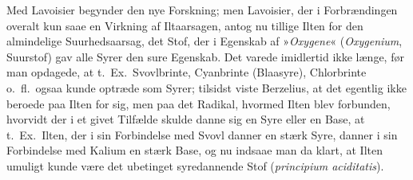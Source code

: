 \documentclass[12pt,a4paper]{book}
\begin{document}
Med Lavoisier begynder den nye Forskning; men Lavoisier,
der i Forbrændingen overalt kun saae en Virkning af Iltaarsagen,
antog nu tillige Ilten for den almindelige Suurhedsaarsag,
det Stof, der i Egenskab af »\textit{Oxygene}«
(\textit{Oxygenium}, Suurstof) gav alle Syrer den sure Egenskab. Det
varede imidlertid ikke længe, før man opdagede, at t.\ Ex.\
Svovlbrinte, Cyanbrinte (Blaasyre), Chlorbrinte o.\ fl.\ ogsaa
kunde optræde som Syrer; tilsidst viste Berzelius, at det
egentlig ikke beroede paa Ilten for sig, men paa det Radikal,
hvormed Ilten blev forbunden, hvorvidt der i et givet Tilfælde
skulde danne sig en Syre eller en Base, at t.\ Ex.\ Ilten,
der i sin Forbindelse med Svovl danner en stærk Syre,
danner i sin Forbindelse med Kalium en stærk Base, og nu
indsaae man da klart, at Ilten umuligt kunde være det ubetinget
syredannende Stof (\textit{principium aciditatis}).
\end{document}
